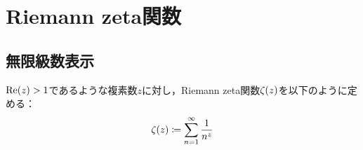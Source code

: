 \documentclass[a4paper,draft]{ltjsarticle}
\begin{document}
\section{Riemann zeta関数}\label{sec:RiemannZeta}
\subsection{無限級数表示}
\begin{defi}\label{def:RiemannZeta-def}
    $\re{z}>1$であるような複素数$z$に対し，Riemann zeta関数$\fun{\zeta}{z}$を以下のように定める：
    \begin{equation}
        \fun{\zeta}{z} \coloneqq \sum_{n=1}^\infty \frac{1}{n^z}\label{eq:RiemannZeta-def}
    \end{equation}
\end{defi}
\end{document}
